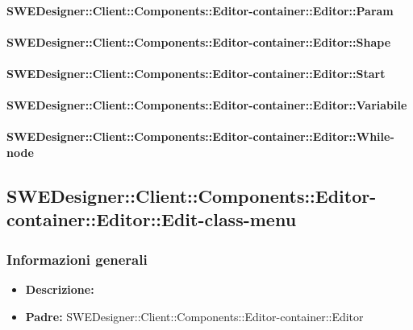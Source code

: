 			\paragraph{SWEDesigner::Client::Components::Editor-container::Editor::Param}
				
				
			\paragraph{SWEDesigner::Client::Components::Editor-container::Editor::Shape}
				
				
			\paragraph{SWEDesigner::Client::Components::Editor-container::Editor::Start}
				
				
			\paragraph{SWEDesigner::Client::Components::Editor-container::Editor::Variabile}
				
				
			\paragraph{SWEDesigner::Client::Components::Editor-container::Editor::While-node}
				
				
	\subsection{SWEDesigner::Client::Components::Editor-container::Editor::Edit-class-menu}
		\subsubsection{Informazioni generali}
			\begin{itemize}
          		\item \textbf{Descrizione:}\\
          		
          		\item \textbf{Padre:} SWEDesigner::Client::Components::Editor-container::Editor
          	\end{itemize}

